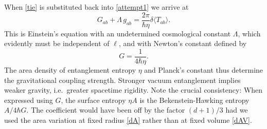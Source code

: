 \documentclass[aps,prd,twocolumn,showpacs,groupedaddress,nofootinbib,longbibliography]{revtex4-1}
\def\beq{\begin{equation}}
\def\eeq{\end{equation}}
\def\la{\langle}
\def\ra{\rangle}
\def\d{\delta}\def\D{\Delta}
\begin{document}
When \eqref{tie} is substituted back into \eqref{attempt1} we arrive at
%
\beq\label{bingo}
G_{ab} +\Lambda \,g_{ab}= \frac{2\pi}{\hbar\eta}\d\la T_{ab}\ra.
\eeq
% 
This is Einstein's equation with an undetermined cosmological constant $\Lambda$, which evidently must 
be independent of $\ell$,
and with Newton's constant defined by 
%
\beq
G=\frac{1}{4\hbar\eta}.
\eeq
%
The area density of entanglement entropy $\eta$ and Planck's constant thus determine the gravitational coupling strength.
Stronger vacuum entanglement implies weaker gravity, i.e.\ greater spacetime rigidity. 
Note the crucial consistency: When expressed using $G$, the surface entropy $\eta A$ is the Bekenstein-Hawking entropy 
$A/4\hbar G$. The coefficient would have been off by the factor $(d+1)/3$ had we used the area variation at fixed
radius \eqref{dA} rather than at fixed volume \eqref{dAV}. 
\end{document}
